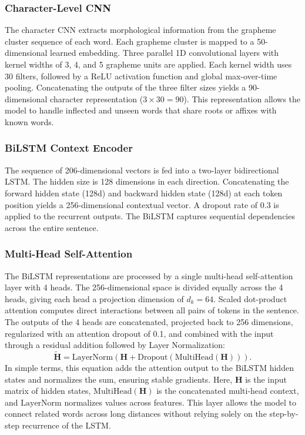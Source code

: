\documentclass[pdflatex,sn-mathphys-num]{sn-jnl}
\begin{document}
\subsubsection{Character-Level CNN}\label{subsubsec:char_cnn}

The character CNN extracts morphological information from the grapheme cluster sequence of each word. Each grapheme cluster is mapped to a 50-dimensional learned embedding. Three parallel 1D convolutional layers with kernel widths of 3, 4, and 5 grapheme units are applied. Each kernel width uses 30 filters, followed by a ReLU activation function and global max-over-time pooling. Concatenating the outputs of the three filter sizes yields a 90-dimensional character representation ($3 \times 30 = 90$). This representation allows the model to handle inflected and unseen words that share roots or affixes with known words.

\subsubsection{BiLSTM Context Encoder}\label{subsubsec:bilstm}

The sequence of 206-dimensional vectors is fed into a two-layer bidirectional LSTM. The hidden size is 128 dimensions in each direction. Concatenating the forward hidden state (128d) and backward hidden state (128d) at each token position yields a 256-dimensional contextual vector. A dropout rate of 0.3 is applied to the recurrent outputs. The BiLSTM captures sequential dependencies across the entire sentence.

\subsubsection{Multi-Head Self-Attention}\label{subsubsec:attention}

The BiLSTM representations are processed by a single multi-head self-attention layer with 4 heads. The 256-dimensional space is divided equally across the 4 heads, giving each head a projection dimension of $d_k = 64$. Scaled dot-product attention computes direct interactions between all pairs of tokens in the sentence. The outputs of the 4 heads are concatenated, projected back to 256 dimensions, regularized with an attention dropout of 0.1, and combined with the input through a residual addition followed by Layer Normalization:
\[
\tilde{\mathbf{H}} = \text{LayerNorm}(\mathbf{H} + \text{Dropout}(\text{MultiHead}(\mathbf{H}))).
\]
In simple terms, this equation adds the attention output to the BiLSTM hidden states and normalizes the sum, ensuring stable gradients. Here, $\mathbf{H}$ is the input matrix of hidden states, $\text{MultiHead}(\mathbf{H})$ is the concatenated multi-head context, and $\text{LayerNorm}$ normalizes values across features. This layer allows the model to connect related words across long distances without relying solely on the step-by-step recurrence of the LSTM.
\end{document}
